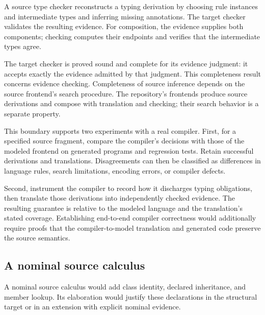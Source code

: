 
\label{sec:compiler}

A source type checker reconstructs a typing derivation by choosing rule
instances and intermediate types and inferring missing annotations.
The target checker validates the resulting evidence.
For composition, the evidence supplies both components; checking
computes their endpoints and verifies that the intermediate types agree.

The target checker is proved sound and complete for its evidence
judgment: it accepts exactly the evidence admitted by that judgment.
This completeness result concerns evidence checking. Completeness of
source inference depends on the source frontend's search procedure.
The repository's frontends produce source derivations and compose with
translation and checking; their search behavior is a separate property.

This boundary supports two experiments with a real compiler.
First, for a specified source fragment, compare the compiler's decisions
with those of the modeled frontend on generated programs and regression
tests. Retain successful derivations and translations. Disagreements
can then be classified as differences in language rules, search
limitations, encoding errors, or compiler defects.

Second, instrument the compiler to record how it discharges typing
obligations, then translate those derivations into independently checked
evidence.
The resulting guarantee is relative to the modeled language and the
translation's stated coverage. Establishing end-to-end compiler
correctness would additionally require proofs that the compiler-to-model
translation and generated code preserve the source semantics.

\subsection*{A nominal source calculus}
A nominal source calculus would add class identity, declared
inheritance, and member lookup. Its elaboration would justify these
declarations in the structural target or in an extension with explicit
nominal evidence.

